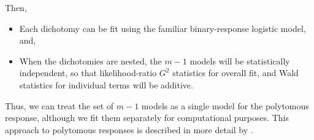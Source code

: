 Then,
\begin{itemize}

\item Each dichotomy can be fit using the familiar binary-response
 logistic model, and,
\item When the dichotomies are nested, the \(m - 1\) models will be statistically independent, so
that likelihood-ratio \(G^2\) statistics for overall fit, and
Wald statistics for individual terms will be additive.
\end{itemize}
Thus, we can treat the set of \(m - 1\) models as a single model
for the polytomous response, although we fit them separately for
computational purposes.  This approach to polytomous responses
is described in more detail by \citet{Fox:97}.



